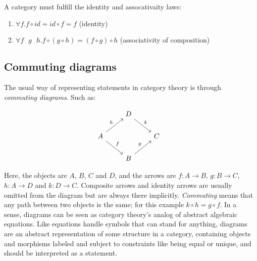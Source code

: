 A category must fulfill the identity and assocativaity laws:

\begin{enumerate}
  \item $ \forall f. f \circ id = id \circ f = f $ (identity)
  \item $ \forall f\text{ }g\text{ }h. f \circ (g \circ h) = (f \circ g) \circ h $ (associativity of composition)
\end{enumerate}

\subsection{Commuting diagrams}
The usual way of representing statements in category theory is through \textit{commuting diagrams}. Such as:

\[\begin{tikzcd}
	& D \\
	A && C \\
	& B
	\arrow["f", from=2-1, to=3-2]
	\arrow["g", from=3-2, to=2-3]
	\arrow["h", from=2-1, to=1-2]
	\arrow["k", from=1-2, to=2-3]
\end{tikzcd}\]

Here, the objects are $ A $, $ B $, $ C $ and $ D $, and the arrows are $ f : A \rightarrow B $, $ g : B \rightarrow C $, $ h : A \rightarrow D $ and $ k : D \rightarrow C $. Composite arrows and identity arrows are usually omitted from the diagram but are always there implicitly. \textit{Commuting} means that any path between two objects is the same; for this example $ k \circ h = g \circ f $. In a sense, diagrams can be seen as category theory's analog of abstract algebraic equations. Like equations handle symbols that can stand for anything, diagrams are an abstract representation of some structure in a category, containing objects and morphisms labeled and subject to constraints like being equal or unique, and should be interpreted as a statement.

